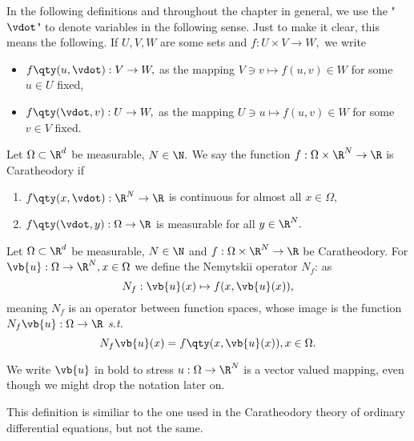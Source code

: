 \begin{remark}
    In the following definitions and throughout the chapter in general, we use the "$\vdot$" to denote variables in the following sense. Just to make it clear, this means the following.
    If $U,V,W$ are some sets and $f: U \times V \to W,$ we write
    \begin{itemize}
	    \item $f\qty(u, \vdot): V \to W,$ as the mapping $V \ni v \mapsto f(u,v) \in W$ for some $u \in U$ fixed,
	    \item $f\qty(\vdot, v): U \to W,$ as the mapping $U \ni u \mapsto f(u,v) \in W$ for some $v \in V$ fixed.
    \end{itemize}
\end{remark}

\begin{definition}
	Let $\Omega \subset \R^{d}$ be measurable, $N \in \N.$ We say the function $f: \Omega \times \R^{N} \to \R$ is Caratheodory if
	\begin{enumerate}
		\item $f\qty(x, \vdot): \R^{N} \to \R$ is continuous for almost all $x \in \Omega,$
		\item $f\qty(\vdot, y): \Omega \to \R$ is measurable for all $y \in \R^{N}.$
	\end{enumerate}
\end{definition}

\begin{definition}
	Let $\Omega \subset \R^{d}$ be measurable, $N \in \N$ and $f: \Omega \times \R^{N} \to \R$ be Caratheodory. For $\vb{u}: \Omega \to \R^N, x \in \Omega$ we define the Nemytskii operator $N_f$: as
    \[
	    N_f: \vb{u}(x) \mapsto f(x,\vb{u}(x)),
    \]
    meaning $N_f$ is an operator between function spaces, whose image is the function $N_f\vb{u}:\Omega \to \R $ \textit{s.t.}
    \[
	    N_f\vb{u}(x) = f\qty(x,\vb{u}(x)), x \in \Omega.
    \]
    
\end{definition}

\begin{remark}
    We write $\vb{u}$ in bold to stress $u: \Omega \to \R^{N}$ is a vector valued mapping, even though we might drop the notation later on.
\end{remark}

\begin{remark}
    This definition is similiar to the one used in the Caratheodory theory of ordinary differential equations, but not the same.
\end{remark}

